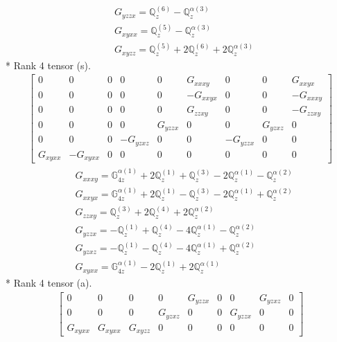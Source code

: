 \documentclass[fleqn,8pt,landscape]{jsarticle}
\begin{document}
\begin{align*}
& G_{yzzx} = \mathbb{Q}_{z}^{(6)} - \mathbb{Q}_{z}^{\alpha(3)} \\
& G_{xyxx} = \mathbb{Q}_{z}^{(5)} - \mathbb{Q}_{z}^{\alpha(3)} \\
& G_{xyzz} = \mathbb{Q}_{z}^{(5)} + 2 \mathbb{Q}_{z}^{(6)} + 2 \mathbb{Q}_{z}^{\alpha(3)}
\end{align*}
* Rank 4 tensor (s).
\begin{align*}
\begin{bmatrix} 0 & 0 & 0 & 0 & 0 & G_{xxxy} & 0 & 0 & G_{xxyx} \\ 0 & 0 & 0 & 0 & 0 & - G_{xxyx} & 0 & 0 & - G_{xxxy} \\ 0 & 0 & 0 & 0 & 0 & G_{zzxy} & 0 & 0 & - G_{zzxy} \\ 0 & 0 & 0 & 0 & G_{yzzx} & 0 & 0 & G_{yzxz} & 0 \\ 0 & 0 & 0 & - G_{yzxz} & 0 & 0 & - G_{yzzx} & 0 & 0 \\ G_{xyxx} & - G_{xyxx} & 0 & 0 & 0 & 0 & 0 & 0 & 0 \end{bmatrix}
\end{align*}
\begin{align*}
& G_{xxxy} = \mathbb{G}_{4z}^{\alpha(1)} + 2 \mathbb{Q}_{z}^{(1)} + \mathbb{Q}_{z}^{(3)} - 2 \mathbb{Q}_{z}^{\alpha(1)} - \mathbb{Q}_{z}^{\alpha(2)} \\
& G_{xxyx} = \mathbb{G}_{4z}^{\alpha(1)} + 2 \mathbb{Q}_{z}^{(1)} - \mathbb{Q}_{z}^{(3)} - 2 \mathbb{Q}_{z}^{\alpha(1)} + \mathbb{Q}_{z}^{\alpha(2)} \\
& G_{zzxy} = \mathbb{Q}_{z}^{(3)} + 2 \mathbb{Q}_{z}^{(4)} + 2 \mathbb{Q}_{z}^{\alpha(2)} \\
& G_{yzzx} = - \mathbb{Q}_{z}^{(1)} + \mathbb{Q}_{z}^{(4)} - 4 \mathbb{Q}_{z}^{\alpha(1)} - \mathbb{Q}_{z}^{\alpha(2)} \\
& G_{yzxz} = - \mathbb{Q}_{z}^{(1)} - \mathbb{Q}_{z}^{(4)} - 4 \mathbb{Q}_{z}^{\alpha(1)} + \mathbb{Q}_{z}^{\alpha(2)} \\
& G_{xyxx} = \mathbb{G}_{4z}^{\alpha(1)} - 2 \mathbb{Q}_{z}^{(1)} + 2 \mathbb{Q}_{z}^{\alpha(1)}
\end{align*}
* Rank 4 tensor (a).
\begin{align*}
\begin{bmatrix} 0 & 0 & 0 & 0 & G_{yzzx} & 0 & 0 & G_{yzxz} & 0 \\ 0 & 0 & 0 & G_{yzxz} & 0 & 0 & G_{yzzx} & 0 & 0 \\ G_{xyxx} & G_{xyxx} & G_{xyzz} & 0 & 0 & 0 & 0 & 0 & 0 \end{bmatrix}
\end{align*}
\end{document}
